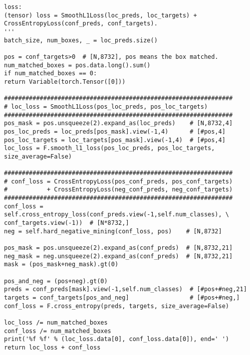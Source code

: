 \begin{lstlisting}[caption={损失函数}]
loss:
(tensor) loss = SmoothL1Loss(loc_preds, loc_targets) + CrossEntropyLoss(conf_preds, conf_targets).
'''
batch_size, num_boxes, _ = loc_preds.size()

pos = conf_targets>0  # [N,8732], pos means the box matched.
num_matched_boxes = pos.data.long().sum()
if num_matched_boxes == 0:
return Variable(torch.Tensor([0]))

################################################################
# loc_loss = SmoothL1Loss(pos_loc_preds, pos_loc_targets)
################################################################
pos_mask = pos.unsqueeze(2).expand_as(loc_preds)    # [N,8732,4]
pos_loc_preds = loc_preds[pos_mask].view(-1,4)      # [#pos,4]
pos_loc_targets = loc_targets[pos_mask].view(-1,4)  # [#pos,4]
loc_loss = F.smooth_l1_loss(pos_loc_preds, pos_loc_targets, size_average=False)

################################################################
# conf_loss = CrossEntropyLoss(pos_conf_preds, pos_conf_targets)
#           + CrossEntropyLoss(neg_conf_preds, neg_conf_targets)
################################################################
conf_loss = self.cross_entropy_loss(conf_preds.view(-1,self.num_classes), \
conf_targets.view(-1))  # [N*8732,]
neg = self.hard_negative_mining(conf_loss, pos)    # [N,8732]

pos_mask = pos.unsqueeze(2).expand_as(conf_preds)  # [N,8732,21]
neg_mask = neg.unsqueeze(2).expand_as(conf_preds)  # [N,8732,21]
mask = (pos_mask+neg_mask).gt(0)

pos_and_neg = (pos+neg).gt(0)
preds = conf_preds[mask].view(-1,self.num_classes)  # [#pos+#neg,21]
targets = conf_targets[pos_and_neg]                 # [#pos+#neg,]
conf_loss = F.cross_entropy(preds, targets, size_average=False)

loc_loss /= num_matched_boxes
conf_loss /= num_matched_boxes
print('%f %f' % (loc_loss.data[0], conf_loss.data[0]), end=' ')
return loc_loss + conf_loss
\end{lstlisting}